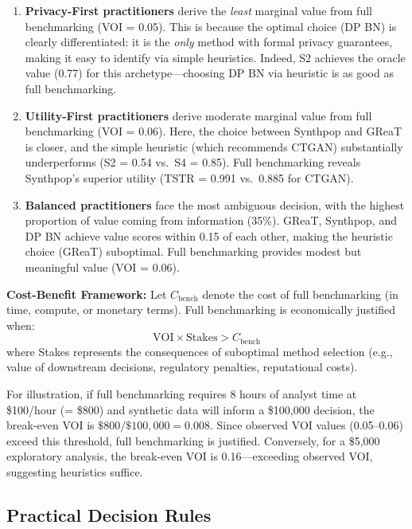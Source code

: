 \documentclass[12pt,a4paper]{article}
\begin{document}
\begin{enumerate}
    \item \textbf{Privacy-First practitioners} derive the \textit{least} marginal value from full benchmarking (VOI = 0.05). This is because the optimal choice (DP BN) is clearly differentiated: it is the \textit{only} method with formal privacy guarantees, making it easy to identify via simple heuristics. Indeed, S2 achieves the oracle value (0.77) for this archetype---choosing DP BN via heuristic is as good as full benchmarking.
    
    \item \textbf{Utility-First practitioners} derive moderate marginal value from full benchmarking (VOI = 0.06). Here, the choice between Synthpop and GReaT is closer, and the simple heuristic (which recommends CTGAN) substantially underperforms (S2 = 0.54 vs.\ S4 = 0.85). Full benchmarking reveals Synthpop's superior utility (TSTR = 0.991 vs.\ 0.885 for CTGAN).
    
    \item \textbf{Balanced practitioners} face the most ambiguous decision, with the highest proportion of value coming from information (35\%). GReaT, Synthpop, and DP BN achieve value scores within 0.15 of each other, making the heuristic choice (GReaT) suboptimal. Full benchmarking provides modest but meaningful value (VOI = 0.06).
\end{enumerate}

\textbf{Cost-Benefit Framework:} Let $C_{\text{bench}}$ denote the cost of full benchmarking (in time, compute, or monetary terms). Full benchmarking is economically justified when:
\begin{equation}
\text{VOI} \times \text{Stakes} > C_{\text{bench}}
\end{equation}
where Stakes represents the consequences of suboptimal method selection (e.g., value of downstream decisions, regulatory penalties, reputational costs).

For illustration, if full benchmarking requires 8 hours of analyst time at \$100/hour (= \$800) and synthetic data will inform a \$100,000 decision, the break-even VOI is $\$800/\$100{,}000 = 0.008$. Since observed VOI values (0.05--0.06) exceed this threshold, full benchmarking is justified. Conversely, for a \$5,000 exploratory analysis, the break-even VOI is 0.16---exceeding observed VOI, suggesting heuristics suffice.

\subsection{Practical Decision Rules}
\end{document}
